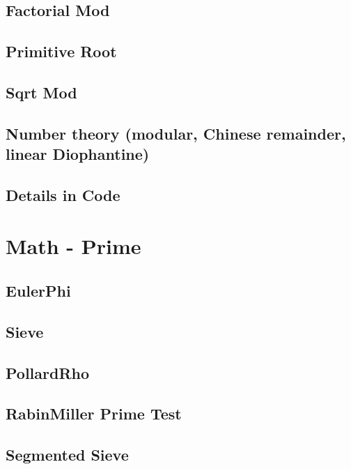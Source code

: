\subsection{Factorial Mod}
\raggedbottom
\hrulefill
\subsection{Primitive Root}
\raggedbottom
\hrulefill
\subsection{Sqrt Mod}
\raggedbottom
\hrulefill
\subsection{Number theory (modular, Chinese remainder, linear Diophantine)}
\raggedbottom
\hrulefill
\subsection{Details in Code}
\raggedbottom
\hrulefill

\section{Math - Prime}
\subsection{EulerPhi}
\raggedbottom
\hrulefill
\subsection{Sieve}
\raggedbottom
\hrulefill
\subsection{PollardRho}
\raggedbottom
\hrulefill
\subsection{RabinMiller Prime Test}
\raggedbottom
\hrulefill
\subsection{Segmented Sieve}
\raggedbottom
\hrulefill

